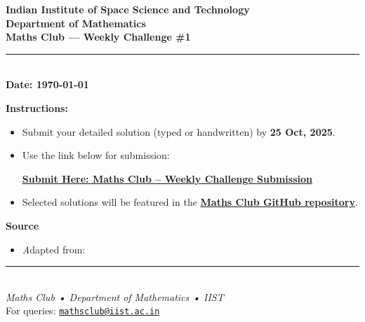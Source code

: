\documentclass[12pt,a4paper]{article}
\newcommand{\challengenumber}{1}                %
\newcommand{\datefield}{\today}           %
\newcommand{\submissiondatefield}{25 Oct, 2025}           %
\newcommand{\submissionlink}{https://forms.gle/GLMsxBVwLkV5kedp7} %
\newcommand{\repolink}{https://github.com/mathsclub-iist/maths-club-weekly-challenges}
\begin{document}
	
	\begin{center}
		\vspace*{0.2cm}
		{\large \textbf{Indian Institute of Space Science and Technology}}\\[2pt]
		{\normalsize \textbf{Department of Mathematics}}\\[8pt]
		{\LARGE \textbf{Maths Club — Weekly Challenge \#\challengenumber}}\\[6pt]
		\rule{0.9\textwidth}{0.4pt}\\[6pt]
		\textbf{Date: \datefield}
	\end{center}
	
	\vspace{0.8em}
	
	\begin{tcolorbox}[
		colback=gray!5,
		colframe=blue!70!black,
		title=\textbf{Challenge Question},
		fonttitle=\large\bfseries,
		boxrule=0.8pt,
		arc=3pt,
		left=6pt,
		right=6pt,
		top=6pt,
		bottom=6pt
		]
	\end{tcolorbox}
	
	\vspace{1em}
	\noindent\textbf{Instructions:}
	\begin{itemize}[left=1em]
		\item Submit your detailed solution (typed or handwritten) by \textbf{\submissiondatefield}.
		\item Use the link below for submission:
		\begin{center}
			\href{\submissionlink}{\textbf{Submit Here: Maths Club – Weekly Challenge Submission}}
		\end{center}
		\item Selected solutions will be featured in the \href{\repolink}{\textbf{Maths Club GitHub repository}}.
	\end{itemize}
	
	\vspace{1.5em}
	
	\noindent\textbf{Source}
	\begin{itemize}[left=1em]
		\item \textit Adapted from: %
	\end{itemize}
	
	
	
	\begin{center}
		\rule{0.9\textwidth}{0.4pt}\\[4pt]
		\textit{Maths Club • Department of Mathematics • IIST}\\
		\vspace{0.3cm}
		\small For queries: \href{mailto:mathsclub@iist.ac.in}{\texttt{mathsclub@iist.ac.in}}
	\end{center}
	
\end{document}
